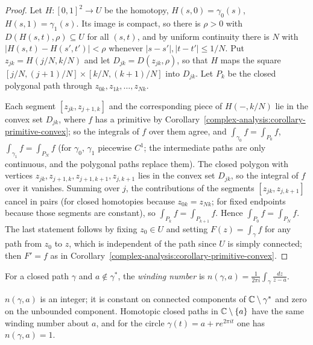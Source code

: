 \begin{proof}
Let $H \colon [0, 1]^2 \to U$ be the homotopy, $H(s, 0) = \gamma_0(s)$, $H(s, 1) = \gamma_1(s)$. Its image is compact, so there is $\rho > 0$ with $D(H(s, t), \rho) \subseteq U$ for all $(s, t)$, and by uniform
continuity there is $N$ with $|H(s, t) - H(s', t')| < \rho$ whenever $|s - s'|, |t - t'| \leq 1/N$. Put $z_{jk} = H(j/N, k/N)$ and let $D_{jk} = D(z_{jk}, \rho)$, so that $H$ maps the square
$[j/N, (j+1)/N] \times [k/N, (k+1)/N]$ into $D_{jk}$. Let $P_k$ be the closed polygonal path through $z_{0k}, z_{1k}, \ldots, z_{Nk}$.

Each segment $[z_{jk}, z_{j+1,k}]$ and the corresponding piece of $H(-, k/N)$ lie in the convex set $D_{jk}$, where $f$ has a primitive by Corollary~\ref{complex-analysis:corollary-primitive-convex}; so the
integrals of $f$ over them agree, and $\int_{\gamma_0}f = \int_{P_0}f$, $\int_{\gamma_1}f = \int_{P_N}f$ (for $\gamma_0$, $\gamma_1$ piecewise $C^1$; the intermediate paths are only continuous, and the
polygonal paths replace them). The closed polygon with vertices $z_{jk}, z_{j+1,k}, z_{j+1,k+1}, z_{j,k+1}$ lies in the convex set $D_{jk}$, so the integral of $f$ over it vanishes. Summing over $j$, the
contributions of the segments $[z_{jk}, z_{j,k+1}]$ cancel in pairs (for closed homotopies because $z_{0k} = z_{Nk}$; for fixed endpoints because those segments are constant), so
$\int_{P_k}f = \int_{P_{k+1}}f$. Hence $\int_{P_0}f = \int_{P_N}f$. The last statement follows by fixing $z_0 \in U$ and setting $F(z) = \int_\gamma f$ for any path from $z_0$ to $z$, which is independent
of the path since $U$ is simply connected; then $F' = f$ as in Corollary~\ref{complex-analysis:corollary-primitive-convex}.
\end{proof}

\begin{definition}\label{complex-analysis:definition-winding-number}
For a closed path $\gamma$ and $a \notin \gamma^*$, the \emph{winding number} is $n(\gamma, a) = \frac{1}{2\pi i}\int_\gamma\frac{dz}{z - a}$.
\end{definition}

\begin{proposition}\label{complex-analysis:proposition-winding-number}
$n(\gamma, a)$ is an integer; it is constant on connected components of $\mathbb{C} \setminus \gamma^*$ and zero on the unbounded component. Homotopic closed paths in $\mathbb{C} \setminus \{a\}$ have the same winding
number about $a$, and for the circle $\gamma(t) = a + re^{2\pi it}$ one has $n(\gamma, a) = 1$.
\end{proposition}


